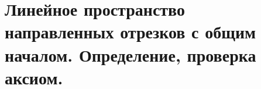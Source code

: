 \section{Линейное пространство направленных отрезков с общим началом. Определение, проверка аксиом.}

\pagebreak
